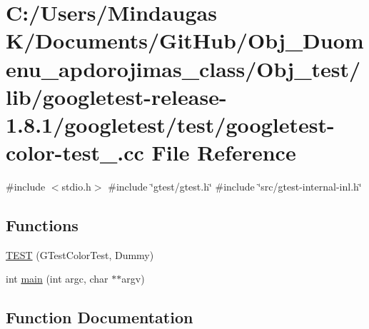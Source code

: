 \hypertarget{_obj__test_2lib_2googletest-release-1_88_81_2googletest_2test_2googletest-color-test___8cc}{}\section{C\+:/\+Users/\+Mindaugas K/\+Documents/\+Git\+Hub/\+Obj\+\_\+\+Duomenu\+\_\+apdorojimas\+\_\+class/\+Obj\+\_\+test/lib/googletest-\/release-\/1.8.1/googletest/test/googletest-\/color-\/test\+\_\+.cc File Reference}
\label{_obj__test_2lib_2googletest-release-1_88_81_2googletest_2test_2googletest-color-test___8cc}
{\ttfamily \#include $<$stdio.\+h$>$}\newline
{\ttfamily \#include \char`\"{}gtest/gtest.\+h\char`\"{}}\newline
{\ttfamily \#include \char`\"{}src/gtest-\/internal-\/inl.\+h\char`\"{}}\newline
\subsection*{Functions}
\begin{DoxyCompactItemize}
\item 
\mbox{\hyperlink{_obj__test_2lib_2googletest-release-1_88_81_2googletest_2test_2googletest-color-test___8cc_a78903f80b07f944e7aa466ebdff1d644}{T\+E\+ST}} (G\+Test\+Color\+Test, Dummy)
\item 
int \mbox{\hyperlink{_obj__test_2lib_2googletest-release-1_88_81_2googletest_2test_2googletest-color-test___8cc_a3c04138a5bfe5d72780bb7e82a18e627}{main}} (int argc, char $\ast$$\ast$argv)
\end{DoxyCompactItemize}


\subsection{Function Documentation}
\mbox{\label{_obj__test_2lib_2googletest-release-1_88_81_2googletest_2test_2googletest-color-test___8cc_a3c04138a5bfe5d72780bb7e82a18e627}} 
